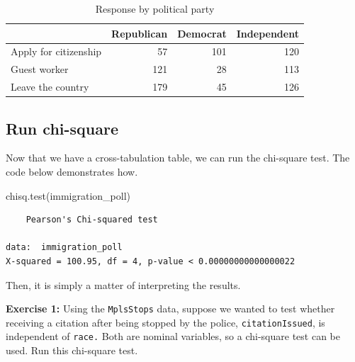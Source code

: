 \documentclass[
]{book}
\makeatletter
\newenvironment{Shaded}{\begin{snugshade}}{\end{snugshade}}
\newcommand{\FunctionTok}[1]{\textcolor[rgb]{0,0,0}{#1}}
\newcommand{\NormalTok}[1]{#1}
\newcommand{\OtherTok}[1]{\textcolor[rgb]{0.37,0.37,0.37}{#1}}
\newcommand{\SpecialCharTok}[1]{\textcolor[rgb]{0,0,0}{#1}}
\newenvironment{kframe}{%
\medskip{}
\setlength{\fboxsep}{.8em}
 \def\at@end@of@kframe{}%
 \ifinner\ifhmode%
  \def\at@end@of@kframe{\end{minipage}}%
  \begin{minipage}{\columnwidth}%
 \fi\fi%
 \def\FrameCommand##1{\hskip\@totalleftmargin \hskip-\fboxsep
 \colorbox{shadecolor}{##1}\hskip-\fboxsep
     \hskip-\linewidth \hskip-\@totalleftmargin \hskip\columnwidth}%
 \MakeFramed {\advance\hsize-\width
   \@totalleftmargin\z@ \linewidth\hsize
   \@setminipage}}%
 {\par\unskip\endMakeFramed%
 \at@end@of@kframe}
\renewenvironment{Shaded}{\begin{kframe}}{\end{kframe}}
\newenvironment{rmdblock}[1]
  {\begin{shaded*}
  }
  {\end{shaded*}
  }
\newenvironment{learncheck}
  {\begin{rmdblock}{warning}}
  {\end{rmdblock}}
\makeatother
\begin{document}
\begin{Shaded}
\end{Shaded}

\begin{table}

\caption{\label{tab:unnamed-chunk-188}Response by political party}
\centering
\begin{tabular}[t]{l|r|r|r}
\hline
  & Republican & Democrat & Independent\\
\hline
Apply for citizenship & 57 & 101 & 120\\
\hline
Guest worker & 121 & 28 & 113\\
\hline
Leave the country & 179 & 45 & 126\\
\hline
\end{tabular}
\end{table}

\hypertarget{run-chi-square}{%
\subsection{Run chi-square}\label{run-chi-square}}

Now that we have a cross-tabulation table, we can run the chi-square test. The code below demonstrates how.

\begin{Shaded}
\begin{Highlighting}[]
\FunctionTok{chisq.test}\NormalTok{(immigration\_poll)}
\end{Highlighting}
\end{Shaded}

\begin{verbatim}
	Pearson's Chi-squared test

data:  immigration_poll
X-squared = 100.95, df = 4, p-value < 0.00000000000000022
\end{verbatim}

Then, it is simply a matter of interpreting the results.

\begin{learncheck}
\textbf{Exercise 1:} Using the \texttt{MplsStops} data, suppose we
wanted to test whether receiving a citation after being stopped by the
police, \texttt{citationIssued}, is independent of \texttt{race.} Both
are nominal variables, so a chi-square test can be used. Run this
chi-square test.
\end{learncheck}
\end{document}
